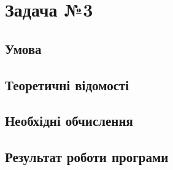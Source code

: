 \documentclass[a4paper, 12pt]{article}
\begin{document}
\newpage
\section{Задача №3}

\subsection{Умова}

\subsection{Теоретичні відомості}

\subsection{Необхідні обчислення}

\subsection{Результат роботи програми}
\end{document}
